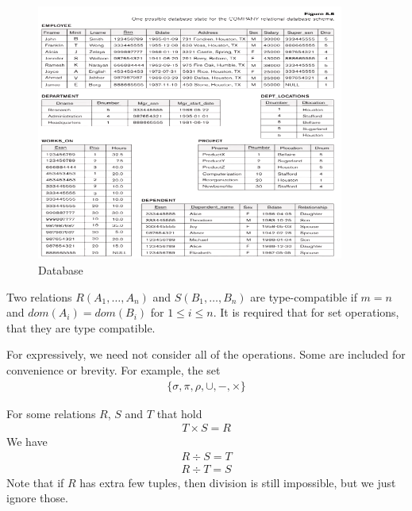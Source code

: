 \documentclass[a4paper]{article}
\theoremstyle{plain}
\theoremstyle{definition}
\newtheorem{defn}{Definition}[section]
\theoremstyle{remark}
\begin{document}
\begin{figure}[H]
	\centering
	\includegraphics[width=0.9\textwidth]{fig.png}
	\caption{Database}
	\label{fig:fig-png}
\end{figure}
\begin{tcolorbox}[colback=black!3!white,colframe=black!60!white,title=\begin{defn}Compatability \label{Compatability}\end{defn}]
Two relations $R(A_1,\ldots,A_n)$ and $S(B_1,\ldots,B_n)$ are type-compatible if $m=n$ and $dom(A_i) = dom(B_i)$ for  $1\le i\le n$. It is required that for set operations, that they are type compatible. 
\end{tcolorbox}
\begin{tcolorbox}[colback=black!3!white,colframe=black!60!white,title=\begin{defn}Completeness \label{Completeness}\end{defn}]
For expressively, we need not consider all of the operations. Some are included for convenience or brevity. For example, the set
\begin{align}
\{\sigma,\pi,\rho,\cup ,-,\times \}
\end{align}
\end{tcolorbox}
\begin{tcolorbox}[colback=black!3!white,colframe=black!60!white,title=\begin{defn}Division \label{Division}\end{defn}]
For some relations $R$, $S$ and $T$ that hold
\begin{align}
	T \times S = R
\end{align}
We have
\begin{align}
	R \div S = T \\
	R \div T = S
\end{align}
Note that if $R$ has extra few tuples, then division is still impossible, but we just ignore those.
\end{tcolorbox}
\end{document}
